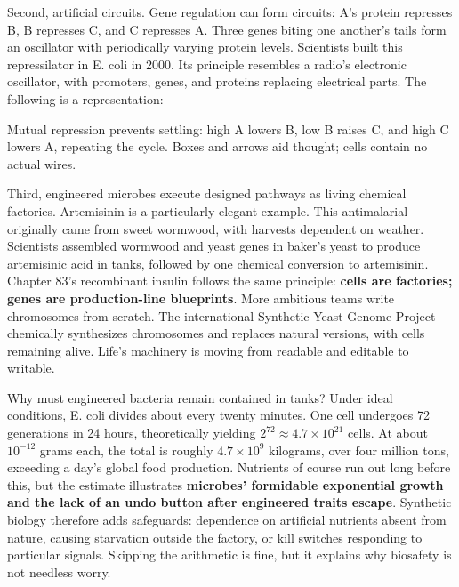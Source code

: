 Second, artificial circuits. Gene regulation can form circuits: A's protein represses B, B represses C, and C represses A. Three genes biting one another's tails form an oscillator with periodically varying protein levels. Scientists built this repressilator in E. coli in 2000. Its principle resembles a radio's electronic oscillator, with promoters, genes, and proteins replacing electrical parts. The following is a representation:

\begin{center}
\end{center}

Mutual repression prevents settling: high A lowers B, low B raises C, and high C lowers A, repeating the cycle. Boxes and arrows aid thought; cells contain no actual wires.

Third, engineered microbes execute designed pathways as living chemical factories. Artemisinin is a particularly elegant example. This antimalarial originally came from sweet wormwood, with harvests dependent on weather. Scientists assembled wormwood and yeast genes in baker's yeast to produce artemisinic acid in tanks, followed by one chemical conversion to artemisinin. Chapter 83's recombinant insulin follows the same principle: \textbf{cells are factories; genes are production-line blueprints}. More ambitious teams write chromosomes from scratch. The international Synthetic Yeast Genome Project chemically synthesizes chromosomes and replaces natural versions, with cells remaining alive. Life's machinery is moving from readable and editable to writable.

\begin{tiaozhan}
Why must engineered bacteria remain contained in tanks? Under ideal conditions, E. coli divides about every twenty minutes. One cell undergoes 72 generations in 24 hours, theoretically yielding $2^{72} \approx 4.7\times 10^{21}$ cells. At about $10^{-12}$ grams each, the total is roughly $4.7\times 10^{9}$ kilograms, over four million tons, exceeding a day's global food production. Nutrients of course run out long before this, but the estimate illustrates \textbf{microbes' formidable exponential growth and the lack of an undo button after engineered traits escape}. Synthetic biology therefore adds safeguards: dependence on artificial nutrients absent from nature, causing starvation outside the factory, or kill switches responding to particular signals. Skipping the arithmetic is fine, but it explains why biosafety is not needless worry.
\end{tiaozhan}

